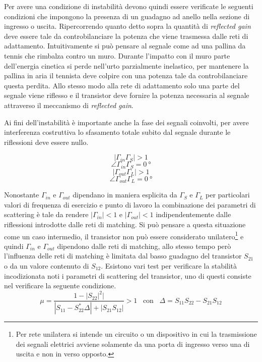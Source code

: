 \documentclass[12pt,oneside]{book}
\begin{document}
Per avere una condizione di instabilità devono quindi essere verificate le seguenti condizioni che impongono la presenza di un guadagno ad anello nella sezione di ingresso o uscita. Ripercorrendo quanto detto sopra la quantità di \textit{reflected gain} deve essere tale da controbilanciare la potenza che viene trasmessa dalle reti di adattamento. Intuitivamente si può pensare al segnale come ad una pallina da tennis che rimbalza contro un muro. Durante l'impatto con il muro parte dell'energia cinetica si perde nell'urto parzialmente inelastico, per mantenere la pallina in aria il tennista deve colpire con una potenza tale da controbilanciare questa perdita. Allo stesso modo alla rete di adattamento solo una parte del segnale viene riflesso e il transistor deve fornire la potenza necessaria al segnale attraverso il meccanismo di \textit{reflected gain}.

Ai fini dell'instabilità è importante anche la fase dei segnali coinvolti, per avere interferenza costruttiva lo sfasamento totale subito dal segnale durante le riflessioni deve essere nullo.

\begin{equation}
    \left|\Gamma_{in}\Gamma_{S}\right| > 1
\end{equation}
\begin{equation}
    \angle\Gamma_{in}\Gamma_{S} = \SI{0}{\degree}
\end{equation}
\begin{equation}
    \left|\Gamma_{out}\Gamma_{L}\right| > 1
\end{equation}
\begin{equation}
    \angle\Gamma_{out}\Gamma_{L} = \SI{0}{\degree}
\end{equation}

Nonostante $\Gamma_{in}$ e $\Gamma_{out}$ dipendano in maniera esplicita da $\Gamma_{S}$ e $\Gamma_{L}$ per particolari valori di frequenza di esercizio e punto di lavoro la combinazione dei parametri di scattering è tale da rendere $|\Gamma_{in}|<1$ e $|\Gamma_{out}|<1$ indipendentemente dalle riflessioni introdotte dalle reti di matching. Si può pensare a questa situazione come un caso intermedio, il transistor non può essere considerato unilatero\footnote{Per rete unilatera si intende un circuito o un dispositivo in cui la trasmissione dei segnali elettrici avviene solamente da una porta di ingresso verso una di uscita e non in verso opposto.} e quindi $\Gamma_{in}$ e $\Gamma_{out}$ dipendono dalle reti di matching, allo stesso tempo però l'influenza delle reti di matching è limitata dal basso guadagno del transistor $S_{21}$ o da un valore contenuto di $S_{12}$. Esistono vari test per verificare la stabilità incodizionata noti i parametri di scattering del transistor, uno di questi consiste nel verificare la seguente condizione.
\begin{equation}
    \mu = \dfrac{1-\left|S_{22}\right|^2|}{\left|S_{11}-S_{22}^{*}\Delta\right|+\left|S_{21}S_{12}\right|}> 1 \hspace{10pt} \text{con} \hspace{10pt} \Delta=S_{11}S_{22}-S_{21}S_{12}
    \label{mu_factor}
\end{equation}
\end{document}
